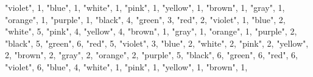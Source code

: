 \documentclass[
]{article}
\newenvironment{Shaded}{\begin{snugshade}}{\end{snugshade}}
\newcommand{\DecValTok}[1]{\textcolor[rgb]{0.00,0.00,0.81}{#1}}
\newcommand{\NormalTok}[1]{#1}
\newcommand{\StringTok}[1]{\textcolor[rgb]{0.31,0.60,0.02}{#1}}
\begin{document}
\begin{Shaded}
\begin{Highlighting}[]
  \StringTok{"violet"}\NormalTok{, }\DecValTok{1}\NormalTok{,}
  \StringTok{"blue"}\NormalTok{, }\DecValTok{1}\NormalTok{,}
  \StringTok{"white"}\NormalTok{, }\DecValTok{1}\NormalTok{,}
  \StringTok{"pink"}\NormalTok{, }\DecValTok{1}\NormalTok{,}
  \StringTok{"yellow"}\NormalTok{, }\DecValTok{1}\NormalTok{,}
  \StringTok{"brown"}\NormalTok{, }\DecValTok{1}\NormalTok{,}
  \StringTok{"gray"}\NormalTok{, }\DecValTok{1}\NormalTok{,}
  \StringTok{"orange"}\NormalTok{, }\DecValTok{1}\NormalTok{,}
  \StringTok{"purple"}\NormalTok{, }\DecValTok{1}\NormalTok{,}
    \StringTok{"black"}\NormalTok{, }\DecValTok{4}\NormalTok{,}
  \StringTok{"green"}\NormalTok{, }\DecValTok{3}\NormalTok{,}
  \StringTok{"red"}\NormalTok{, }\DecValTok{2}\NormalTok{,}
  \StringTok{"violet"}\NormalTok{, }\DecValTok{1}\NormalTok{,}
  \StringTok{"blue"}\NormalTok{, }\DecValTok{2}\NormalTok{,}
  \StringTok{"white"}\NormalTok{, }\DecValTok{5}\NormalTok{,}
  \StringTok{"pink"}\NormalTok{, }\DecValTok{4}\NormalTok{, }
  \StringTok{"yellow"}\NormalTok{, }\DecValTok{4}\NormalTok{,}
  \StringTok{"brown"}\NormalTok{, }\DecValTok{1}\NormalTok{,}
  \StringTok{"gray"}\NormalTok{, }\DecValTok{1}\NormalTok{,}
  \StringTok{"orange"}\NormalTok{, }\DecValTok{1}\NormalTok{,}
  \StringTok{"purple"}\NormalTok{, }\DecValTok{2}\NormalTok{,}
    \StringTok{"black"}\NormalTok{, }\DecValTok{5}\NormalTok{,}
  \StringTok{"green"}\NormalTok{, }\DecValTok{6}\NormalTok{,}
  \StringTok{"red"}\NormalTok{, }\DecValTok{5}\NormalTok{,}
  \StringTok{"violet"}\NormalTok{, }\DecValTok{3}\NormalTok{,}
  \StringTok{"blue"}\NormalTok{, }\DecValTok{2}\NormalTok{,}
  \StringTok{"white"}\NormalTok{, }\DecValTok{2}\NormalTok{,}
  \StringTok{"pink"}\NormalTok{, }\DecValTok{2}\NormalTok{,}
  \StringTok{"yellow"}\NormalTok{, }\DecValTok{2}\NormalTok{,}
  \StringTok{"brown"}\NormalTok{, }\DecValTok{2}\NormalTok{,}
  \StringTok{"gray"}\NormalTok{, }\DecValTok{2}\NormalTok{,}
  \StringTok{"orange"}\NormalTok{, }\DecValTok{2}\NormalTok{,}
  \StringTok{"purple"}\NormalTok{, }\DecValTok{5}\NormalTok{,}
    \StringTok{"black"}\NormalTok{, }\DecValTok{6}\NormalTok{,}
  \StringTok{"green"}\NormalTok{, }\DecValTok{6}\NormalTok{,}
  \StringTok{"red"}\NormalTok{, }\DecValTok{6}\NormalTok{,}
  \StringTok{"violet"}\NormalTok{, }\DecValTok{6}\NormalTok{, }
  \StringTok{"blue"}\NormalTok{, }\DecValTok{4}\NormalTok{,}
  \StringTok{"white"}\NormalTok{, }\DecValTok{1}\NormalTok{,}
  \StringTok{"pink"}\NormalTok{, }\DecValTok{1}\NormalTok{,}
  \StringTok{"yellow"}\NormalTok{, }\DecValTok{1}\NormalTok{,}
  \StringTok{"brown"}\NormalTok{, }\DecValTok{1}\NormalTok{,}

\end{Highlighting}
\end{Shaded}
\end{document}
